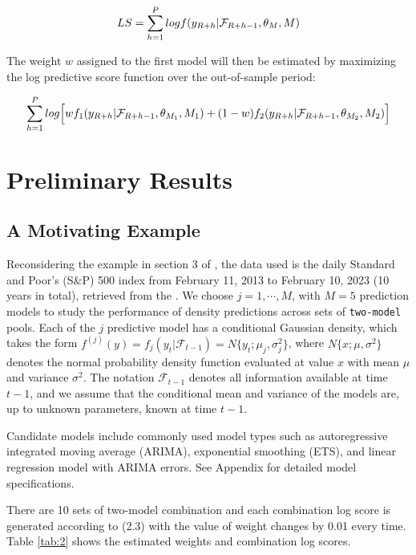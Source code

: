 \documentclass{monashthesis}
\begin{document}
\begin{equation}
LS = \sum^P_{h=1} logf(y_{\small{R+h}}| \mathcal{F}_{\small{R+h-1}}, \theta_M, M)
\end{equation}

The weight \(w\) assigned to the first model will then be estimated by maximizing the log predictive score function over the out-of-sample period:

\begin{equation}
\sum^P_{h=1}log\Big[wf_1(y_{\small{R+h}}|\mathcal{F}_{\small{R+h-1}}, \theta_{M_1}, M_1) + (1-w)f_2(y_{\small{R+h}}|\mathcal{F}_{\small{R+h-1}}, \theta_{M_2}, M_2)\Big]
\end{equation}

\hypertarget{preliminary-results}{%
\chapter{Preliminary Results}\label{preliminary-results}}

\hypertarget{a-motivating-example}{%
\section{A Motivating Example}\label{a-motivating-example}}

Reconsidering the example in section 3 of \textcite{GA11}, the data used is the daily Standard and Poor's (S\&P) 500 index from February 11, 2013 to February 10, 2023 (10 years in total), retrieved from the \textcite{SP500}. We choose \(j=1,\cdots,M\), with \(M=5\) prediction models to study the performance of density predictions across sets of \texttt{two-model} pools. Each of the \(j\) predictive model has a conditional Gaussian density, which takes the form \(f^{(j)}(y)=f_j(y_t|\mathcal{F}_{t-1})=N\{y_t; \mu_j, \sigma^2_j\}\), where \(N\{x; \mu, \sigma^2\}\) denotes the normal probability density function evaluated at value \(x\) with mean \(\mu\) and variance \(\sigma^2\). The notation \(\mathcal{F}_{t-1}\) denotes all information available at time \(t-1\), and we assume that the conditional mean and variance of the models are, up to unknown parameters, known at time \(t-1\).

Candidate models include commonly used model types such as autoregressive integrated moving average (ARIMA), exponential smoothing (ETS), and linear regression model with ARIMA errors. See Appendix for detailed model specifications.

There are 10 sets of two-model combination and each combination log score is generated according to (2.3) with the value of weight changes by 0.01 every time. Table \ref{tab:2} shows the estimated weights and combination log scores.
\end{document}
